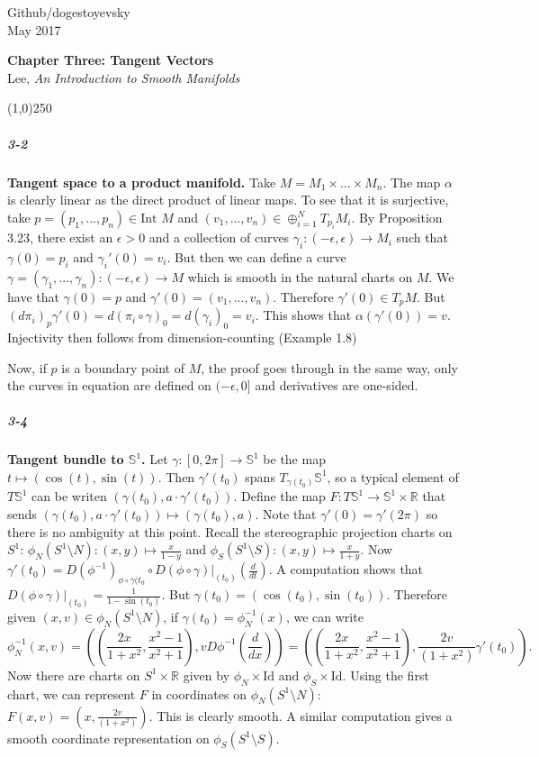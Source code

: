 \documentclass[10pt,letter]{article}
\begin{document}
\noindent Github/dogestoyevsky \\
May 2017
\begin{center}
\textbf{Chapter Three: Tangent Vectors}\\ Lee, \textit{An Introduction to Smooth Manifolds}

\line(1,0){250}
\end{center}

\subparagraph{3-2} \textbf{Tangent space to a product manifold.} Take $M = M_1 \times... \times M_n$. The map $\alpha$ is clearly linear as the direct product of linear maps. To see that it is surjective, take $p = (p_1,...,p_n) \in \text{Int } M$ and $(v_1,...,v_n) \in \oplus_{i=1}^N T_{p_i}M_i$. By Proposition 3.23, there exist an $\epsilon > 0$ and a collection of curves $\gamma_i: (-\epsilon,\epsilon) \rightarrow M_i$ such that $\gamma(0) = p_i$ and $\gamma_i'(0) = v_i$. But then we can define a  curve $\gamma = (\gamma_1,...,\gamma_n): (-\epsilon,\epsilon) \rightarrow M$ which is smooth in the natural charts on $M$. We have that $\gamma(0) = p$ and $\gamma'(0) = (v_1,...,v_n)$. Therefore $\gamma'(0) \in T_pM$. But $(d\pi_i)_p\gamma'(0) = d(\pi_i  \circ \gamma)_0 = d(\gamma_i)_0 = v_i$. This shows that $\alpha(\gamma'(0)) = v$. Injectivity then follows from dimension-counting (Example 1.8)

Now, if $p$ is a boundary point of $M$, the proof goes through in the same way, only the curves in equation are defined on $(-\epsilon,0]$ and derivatives are one-sided. 

\subparagraph{3-4} \textbf{Tangent bundle to $\mathbb{S}^1$.} Let $\gamma: [0,2\pi] \rightarrow \mathbb{S}^1$ be the map $t \mapsto (\cos(t),\sin(t))$. Then $\gamma'(t_0)$ spans $T_{\gamma(t_0)}\mathbb{S}^1$, so a typical element of $T\mathbb{S}^1$ can be writen $(\gamma(t_0),a \cdot \gamma'(t_0))$.  Define the map $F: T\mathbb{S}^1 \rightarrow \mathbb{S}^1 \times \mathbb{R}$ that sends $(\gamma(t_0),a \cdot \gamma'(t_0)) \mapsto (\gamma(t_0),a)$. Note that $\gamma'(0) = \gamma'(2\pi)$ so there is no ambiguity at this point. Recall the stereographic projection charts on $S^1$: $\phi_N(S^1 \setminus N): (x,y) \mapsto \frac{x}{1-y}$ and $\phi_S(S^1 \setminus S): (x,y) \mapsto \frac{x}{1+y}$. Now $\gamma'(t_0) = D(\phi^{-1})_{\phi \circ \gamma(t_0} \circ D(\phi \circ \gamma)\vert_{(t_0)}(\frac{d}{dt})$. A computation shows that $D(\phi \circ \gamma)\vert_{(t_0)} = \frac{1}{1-\sin(t_0)}$. But $\gamma(t_0)= (\cos(t_0),\sin(t_0))$. Therefore given $(x,v) \in \phi_N(S^1 \setminus N)$, if $\gamma(t_0) = \phi_N^{-1}(x)$, we can write
\begin{equation*}
\phi_N^{-1}(x,v) = ((\frac{2x}{1+x^2},\frac{x^2-1}{x^2+1}),vD\phi^{-1}(\frac{d}{dx})) = ((\frac{2x}{1+x^2},\frac{x^2-1}{x^2+1}),\frac{2v}{(1+x^2)} \gamma'(t_0)).
\end{equation*}
Now there are charts on $S^1 \times \mathbb{R}$ given by $\phi_N \times \text{Id}$ and $\phi_S \times \text{Id}$. Using the first chart, we can represent $F$ in coordinates on $\phi_N(S^1 \setminus N)$: $F(x,v) = (x,\frac{2v}{(1+x^2)})$. This is clearly smooth. A similar computation gives a smooth coordinate representation on $\phi_S(S^1 \setminus S)$. 
\end{document}
